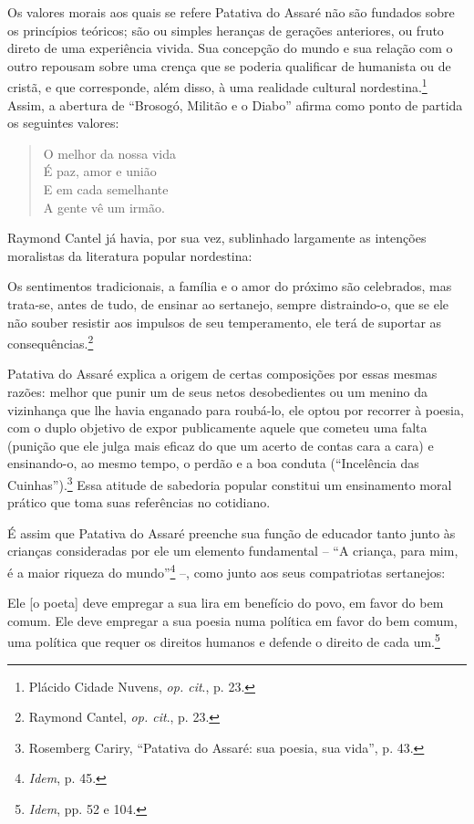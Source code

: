 Os valores morais aos quais se refere Patativa do Assaré não são fundados sobre
os princípios teóricos; são ou simples heranças de gerações anteriores, ou fruto
direto de uma experiência vivida. Sua concepção do mundo e sua relação com o
outro repousam sobre uma crença que se poderia qualificar de humanista ou de
cristã, e que corresponde, além disso, à uma realidade cultural
nordestina.\footnote{ Plácido Cidade Nuvens, \textit{op. cit}., p. 23.} Assim, a
abertura de “Brosogó, Militão e o Diabo” afirma como ponto de partida os
seguintes valores:

\begin{verse}
O melhor da nossa vida\\
É paz, amor e união\\
E em cada semelhante\\
A gente vê um irmão.
\end{verse}

Raymond Cantel já havia, por sua vez, sublinhado largamente as intenções
moralistas da literatura popular nordestina:

\begin{hedraquote}
Os sentimentos tradicionais, a
família e o amor do próximo são celebrados, mas trata-se, antes de tudo, de
ensinar ao sertanejo, sempre distraindo-o, que se ele não souber resistir aos
impulsos de seu temperamento, ele terá de suportar as consequências.\footnote{
Raymond Cantel, \textit{op. cit}., p. 23.}
\end{hedraquote}

\noindent Patativa do Assaré explica a origem
de certas composições por essas mesmas razões: melhor que punir um de seus netos
desobedientes ou um menino da vizinhança que lhe havia enganado para roubá-lo,
ele optou por recorrer à poesia, com o duplo objetivo de expor publicamente
aquele que cometeu uma falta (punição que ele julga mais eficaz do que um acerto
de contas cara a cara) e ensinando-o, ao mesmo tempo, o perdão e a boa conduta
(“Incelência das Cuinhas”).\footnote{ Rosemberg Cariry, “Patativa do Assaré: sua
poesia, sua vida”, p. 43.} Essa atitude de sabedoria popular constitui um
ensinamento moral prático que toma suas referências no cotidiano.

É assim que Patativa do Assaré preenche sua função de educador tanto junto às
crianças consideradas por ele um elemento fundamental -- “A criança, para mim, é
a maior riqueza do mundo”\footnote{ \textit{Idem}, p. 45.} --, como junto aos
seus compatriotas sertanejos:

\begin{hedraquote}
Ele [o poeta] deve empregar a sua lira em
benefício do povo, em favor do bem comum. Ele deve empregar a sua poesia numa
política em favor do bem comum, uma política que requer os direitos humanos e
defende o direito de cada um.\footnote{ \textit{Idem}, pp. 52 e 104.}
\end{hedraquote}

